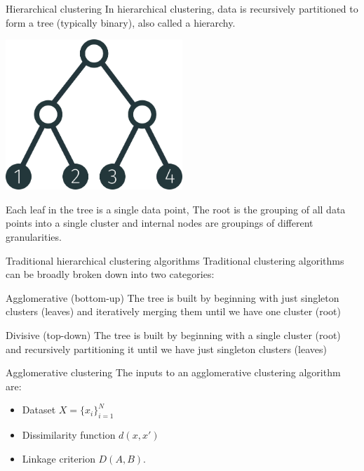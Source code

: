 \documentclass[10pt, compress]{beamer}
\begin{document}
\begin{frame}{Hierarchical clustering}
  In \alert{hierarchical clustering}, data
  is recursively partitioned to form a tree (typically binary),
  also called a hierarchy.

  \begin{center}
    \includegraphics[width=0.5\textwidth]{img/tree-1234-balanced}
  \end{center}

  \pause

  Each leaf in the tree is a single data point,
  The root is the grouping of all data points
  into a single cluster and internal nodes
  are groupings of different granularities.
\end{frame}

\begin{frame}{Traditional hierarchical clustering algorithms}
  Traditional clustering algorithms can be broadly broken
  down into two categories:

  \pause
  \begin{block}{Agglomerative (bottom-up)}
    The tree is built by
      beginning with just singleton clusters (leaves) and
      iteratively merging them until we have one cluster (root)
    \end{block}
  \pause
  \begin{block}{Divisive (top-down)}
    The tree is built
      by beginning with a single cluster (root) and
      recursively partitioning it until we
      have just singleton clusters (leaves)
  \end{block}
\end{frame}

\begin{frame}{Agglomerative clustering}
  The inputs to an agglomerative clustering algorithm
  are:
  \begin{itemize}
    \item<2-> Dataset $X = \{x_i\}_{i = 1}^N$
    \item<3-> Dissimilarity function $d(x, x')$
    \item<4-> Linkage criterion $D(A, B)$.
  \end{itemize}

\end{frame}
\end{document}
